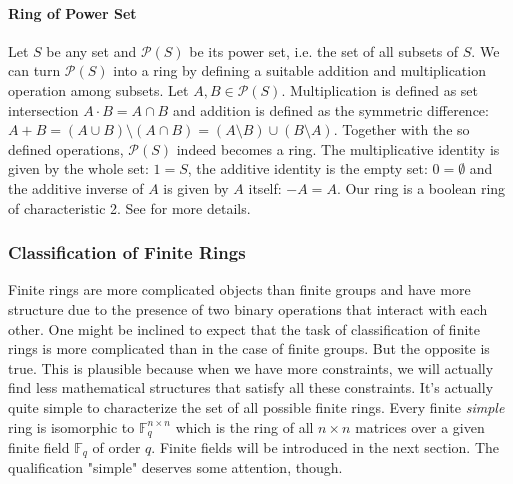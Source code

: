 
\paragraph{Ring of Power Set} Let $S$ be any set and $\mathcal{P}(S)$ be its power set, i.e. the set of all subsets of $S$. We can turn $\mathcal{P}(S)$ into a ring by defining a suitable addition and multiplication operation among subsets. Let $A, B \in \mathcal{P}(S)$. Multiplication is defined as set intersection $A \cdot B = A \cap B$ and addition is defined as the symmetric difference: $A + B = (A \cup B) \setminus (A \cap B) = (A \setminus B) \cup (B \setminus A)$. Together with the so defined operations, $\mathcal{P}(S)$ indeed becomes a ring. The multiplicative identity is given by the whole set: $1 = S$, the additive identity is the empty set: $0 = \emptyset$ and the additive inverse of $A$ is given by $A$ itself: $-A = A$. Our ring is a boolean ring of characteristic 2. See \cite{YT_PowerSetRing} for more details.


\subsubsection{Classification of Finite Rings}
Finite rings are more complicated objects than finite groups and have more structure due to the presence of two binary operations that interact with each other. One might be inclined to expect that the task of classification of finite rings is more complicated than in the case of finite groups. But the opposite is true. This is plausible because when we have more constraints, we will actually find less mathematical structures that satisfy all these constraints. It's actually quite simple to characterize the set of all possible finite rings. Every finite \emph{simple} ring is isomorphic to $\mathbb{F}_q^{n \times n}$ which is the ring of all $n \times n$ matrices over a given finite field $\mathbb{F}_q$ of order $q$. Finite fields will be introduced in the next section. The qualification "simple" deserves some attention, though.


